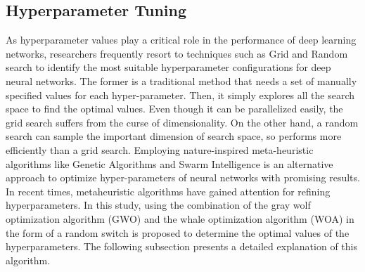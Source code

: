 \documentclass{article}
\begin{document}
\subsection{Hyperparameter Tuning}\label{secBasicHT}
As hyperparameter values play a critical role in the performance of deep learning networks, researchers frequently resort to techniques such as Grid and Random search to identify the most suitable hyperparameter configurations for deep neural networks\cite{alizadeh2020network}. The former is a traditional method that needs a set of manually specified values for each hyper-parameter. Then, it simply explores all the search space to find the optimal values. Even though it can be parallelized easily, the grid search suffers from the curse of dimensionality. On the other hand, a random search can sample the important dimension of search space, so performs more efficiently than a grid search. Employing nature-inspired meta-heuristic algorithms like Genetic Algorithms and Swarm Intelligence is an alternative approach to optimize hyper-parameters of neural networks with promising results. In recent times, metaheuristic algorithms have gained attention for refining hyperparameters\cite{alizadeh2021combination}. In this study, using the combination of the gray wolf optimization algorithm (GWO) and the whale optimization algorithm (WOA) in the form of a random switch is proposed to determine the optimal values of the hyperparameters. The following subsection presents a detailed explanation of this algorithm.
\end{document}
